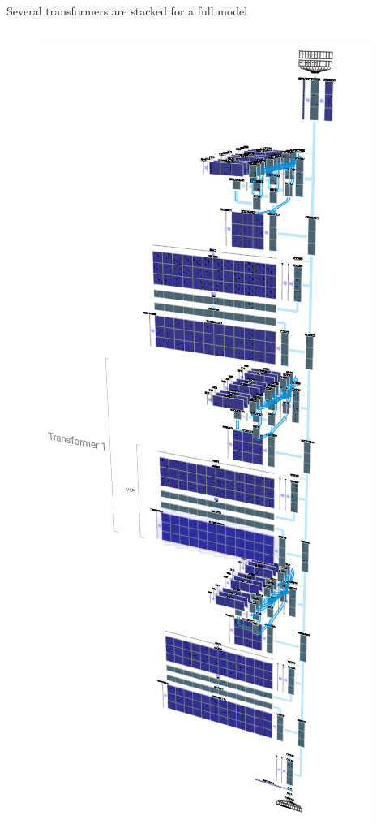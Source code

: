 \documentclass[10pt]{beamer}
\begin{document}
\begin{frame}{Several transformers are stacked for a full model}
	\begin{columns}[T,onlytextwidth]
		\hspace*{-0.7cm} 
		\begin{figure}
			\includegraphics[width=\textwidth]{figures/nanoGPT.png}

\end{figure}
\end{columns}
\end{frame}
\end{document}
